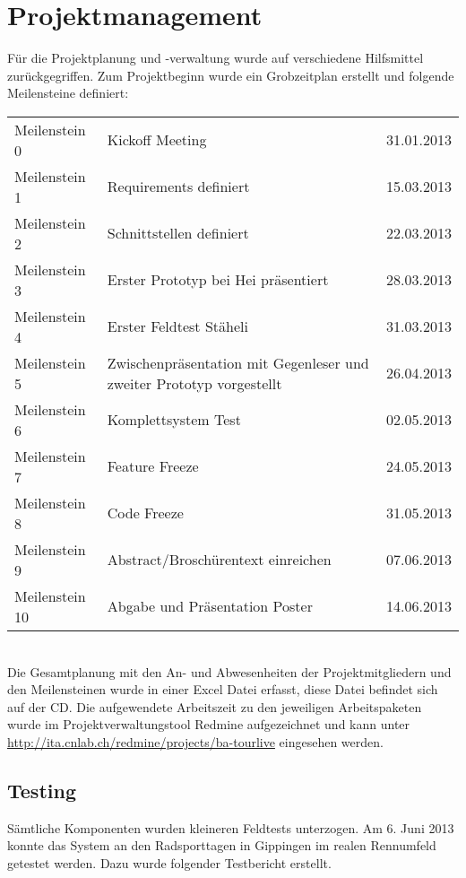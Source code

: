 \section{Projektmanagement}
Für die Projektplanung und -verwaltung wurde auf verschiedene Hilfsmittel zurückgegriffen. Zum Projektbeginn wurde ein Grobzeitplan erstellt und folgende Meilensteine definiert:

\begin{tabular}{p{2.8cm}p{7.5cm}r}
Meilenstein 0 & Kickoff Meeting & 31.01.2013\\
Meilenstein 1 & Requirements definiert & 15.03.2013\\
Meilenstein 2 & Schnittstellen definiert & 22.03.2013\\
Meilenstein 3 & Erster Prototyp bei Hei präsentiert & 28.03.2013\\
Meilenstein 4 & Erster Feldtest Stäheli & 31.03.2013\\
Meilenstein 5 & Zwischenpräsentation mit Gegenleser und zweiter Prototyp vorgestellt & 26.04.2013\\
Meilenstein 6 & Komplettsystem Test & 02.05.2013\\
Meilenstein 7 & Feature Freeze & 24.05.2013\\
Meilenstein 8 & Code Freeze & 31.05.2013\\
Meilenstein 9 & Abstract/Broschürentext einreichen & 07.06.2013\\
Meilenstein 10 & Abgabe und Präsentation Poster & 14.06.2013\\
\end{tabular}
\\

Die Gesamtplanung mit den An- und Abwesenheiten der Projektmitgliedern und den Meilensteinen wurde in einer Excel Datei erfasst, diese Datei befindet sich auf der CD. Die aufgewendete Arbeitszeit zu den jeweiligen Arbeitspaketen wurde im Projektverwaltungstool Redmine aufgezeichnet und kann unter \url{http://ita.cnlab.ch/redmine/projects/ba-tourlive} eingesehen werden.
\\

\subsection{Testing}
Sämtliche Komponenten wurden kleineren Feldtests unterzogen. Am 6. Juni 2013 konnte das System an den Radsporttagen in Gippingen im realen Rennumfeld getestet werden. Dazu wurde folgender Testbericht erstellt.

